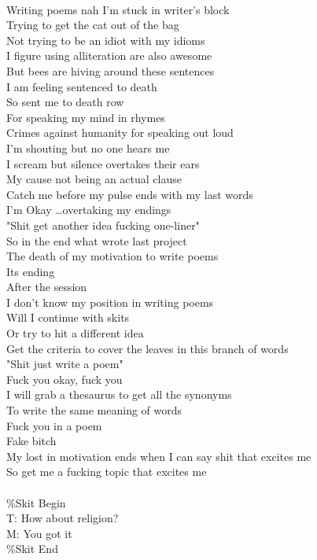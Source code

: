 \documentclass[12pt, b5paper, oneside]{book}
\begin{document}
\\Writing poems nah I'm stuck in writer's block
\\Trying to get the cat out of the bag
\\Not trying to be an idiot with my idioms
\\I figure using alliteration are also awesome
\\But bees are hiving around these sentences
\\I am feeling sentenced  to death
\\So sent me to death row
\\For speaking my mind in rhymes
\\Crimes against humanity for speaking out loud
\\I'm shouting but no one hears me
\\I scream but silence overtakes their ears
\\My cause not being an actual clause
\\Catch me before my pulse ends with my last words
\\I'm Okay \dots overtaking my endings
\\"Shit get another idea fucking one-liner"
\\So in the end what wrote last project
\\The death of my motivation to write poems
\\Its ending
\\After the session
\\I don't know my position in writing poems
\\Will I continue with skits
\\Or try to hit a different idea
\\Get the criteria to cover the leaves in this branch of words
\\"Shit just write a poem"
\\Fuck you okay, fuck you
\\I will grab a thesaurus to get all the synonyms 
\\To write the same meaning of words
\\Fuck you in a poem
\\Fake bitch
\\My lost in motivation ends when I can say shit that excites me
\\So get me a fucking topic that excites me
%
\\\\\%Skit Begin
\\T: How about religion?
\\M: You got it
\\\%Skit End
\newpage
\end{document}
